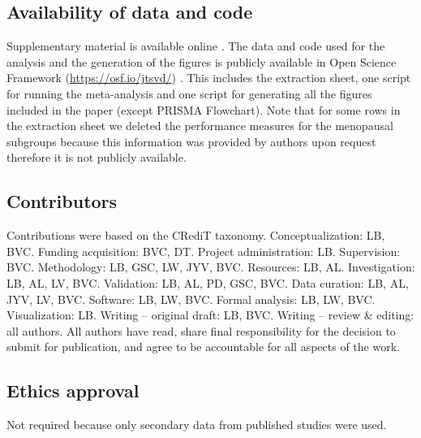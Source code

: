 \subsection*{Availability of data and code}
Supplementary material is available online \cite{barrenadaADNEXRiskPrediction2024}.
The data and code used for the analysis and the generation of the figures is
publicly available in Open Science Framework (\url{https://osf.io/jtsvd/})
 \cite{barrenadaADNEXRiskModel2025}. This includes the extraction sheet, one
script for running the meta-analysis and one script for generating all the
figures included in the paper (except \gls{PRISMA} Flowchart). Note that for some rows
in the extraction sheet we deleted the performance measures for the menopausal
subgroups because this information was provided by authors upon request
therefore it is not publicly available.

\subsection*{Contributors}
Contributions were based on the CRediT taxonomy. Conceptualization: LB, BVC.
Funding acquisition: BVC, DT. Project administration: LB. Supervision: BVC.
Methodology: LB, GSC, LW, JYV, BVC. Resources: LB, AL. Investigation: LB, AL,
LV, BVC. Validation: LB, AL, PD, GSC, BVC. Data curation: LB, AL, JYV, LV, BVC.
Software: LB, LW, BVC. Formal analysis: LB, LW, BVC. Visualization: LB. Writing
– original draft: LB, BVC. Writing – review \& editing: all authors. All authors
have read, share final responsibility for the decision to submit for
publication, and agree to be accountable for all aspects of the work.

\subsection*{Ethics approval}
Not required because only secondary data from published studies were used.
